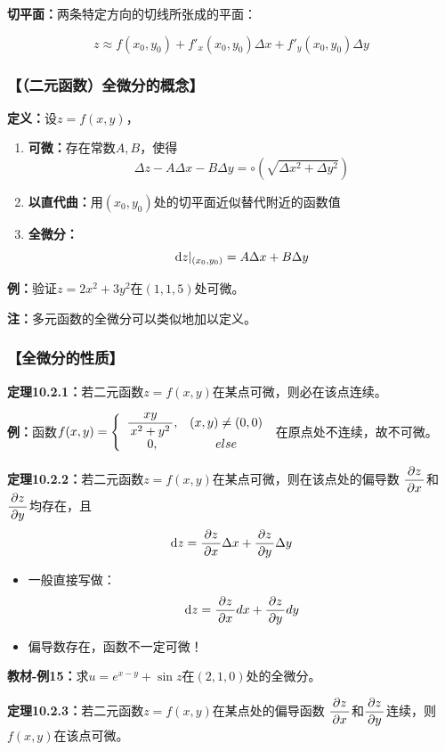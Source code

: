 {\bf 切平面：}两条特定方向的切线所张成的平面：

$$z\approx f(x_0,y_0)+f'_x(x_0,y_0)\Delta x+f'_y(x_0,y_0)\Delta y$$

\subsubsection{【（二元函数）全微分的概念】}

{\bf 定义：}设$z=f(x,y)$，
\begin{enumerate}[(1)]
  \setlength{\itemindent}{1cm}
  \item {\bf 可微：}存在常数$A,B$，使得
  $${\Delta z-A\Delta x-B\Delta y=\circ(\sqrt{\Delta x^2+\Delta y^2})}$$
  \item {\bf 以直代曲：}用$(x_0,y_0)$处的切平面近似替代附近的函数值
  \item {\bf 全微分：}$${\mathrm{d} z|_{(x_0,y_0)}=A\Delta x+B\Delta y}$$
\end{enumerate}

{\bf 例：}验证$z=2x^2+3y^2$在$(1,1,5)$处可微。

{\bf 注：}多元函数的全微分可以类似地加以定义。

\subsubsection{【全微分的性质】}

{\bf 定理10.2.1：}若二元函数$z=f(x,y)$在某点可微，则必在该点连续。

{\bf 例：}函数$f(x,y)=\left\{\begin{array}{cc}
	\displaystyle\frac{\,{xy}\,}{\,{x^2+y^2}\,},& (x,y)\ne (0,0)\\
	0, & else
\end{array}\right.$
在原点处不连续，故不可微。

{\bf 定理10.2.2：}若二元函数$z=f(x,y)$在某点可微，则在该点处的偏导数
$\displaystyle\frac{\,{\partial z}\,}{\,{\partial x}\,}$和$\displaystyle\frac{\,{\partial z}\,}{\,{\partial y}\,}$均存在，且
$$\mathrm{d} z=\displaystyle\frac{\,{\partial z}\,}{\,{\partial x}\,}\Delta x+\displaystyle\frac{\,{\partial z}\,}{\,{\partial y}\,}\Delta y$$

\begin{itemize}
  \item 一般直接写做：
  $${\mathrm{d} z=\displaystyle\frac{\,{\partial z}\,}{\,{\partial x}\,}dx+\displaystyle\frac{\,{\partial z}\,}{\,{\partial y}\,}dy}$$ 
  \item 偏导数存在，函数不一定可微！
\end{itemize}

{\bf 教材-例15：}求$u=e^{x-y}+\sin z$在$(2,1,0)$处的全微分。

{\bf 定理10.2.3：}若二元函数$z=f(x,y)$在某点处的偏导函数
$\displaystyle\frac{\,{\partial z}\,}{\,{\partial x}\,}$和$\displaystyle\frac{\,{\partial z}\,}{\,{\partial y}\,}$连续，则$f(x,y)$在该点可微。

